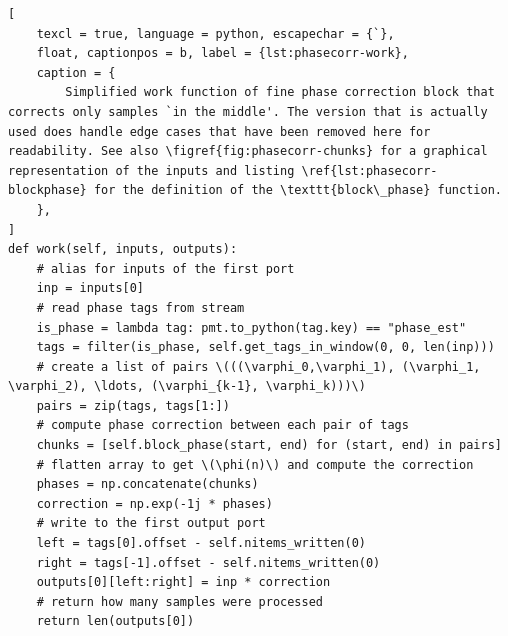 \begin{lstlisting}[
	texcl = true, language = python, escapechar = {`},
	float, captionpos = b, label = {lst:phasecorr-work},
	caption = {
		Simplified work function of fine phase correction block that corrects only samples `in the middle'. The version that is actually used does handle edge cases that have been removed here for readability. See also \figref{fig:phasecorr-chunks} for a graphical representation of the inputs and listing \ref{lst:phasecorr-blockphase} for the definition of the \texttt{block\_phase} function.
	},
]
def work(self, inputs, outputs):
	# alias for inputs of the first port
	inp = inputs[0]
	# read phase tags from stream
	is_phase = lambda tag: pmt.to_python(tag.key) == "phase_est"
	tags = filter(is_phase, self.get_tags_in_window(0, 0, len(inp)))
	# create a list of pairs \(((\varphi_0,\varphi_1), (\varphi_1, \varphi_2), \ldots, (\varphi_{k-1}, \varphi_k)))\)
	pairs = zip(tags, tags[1:])
	# compute phase correction between each pair of tags
	chunks = [self.block_phase(start, end) for (start, end) in pairs]
	# flatten array to get \(\phi(n)\) and compute the correction
	phases = np.concatenate(chunks)
	correction = np.exp(-1j * phases) 
	# write to the first output port
	left = tags[0].offset - self.nitems_written(0)
	right = tags[-1].offset - self.nitems_written(0)
	outputs[0][left:right] = inp * correction
	# return how many samples were processed
	return len(outputs[0])
\end{lstlisting}

